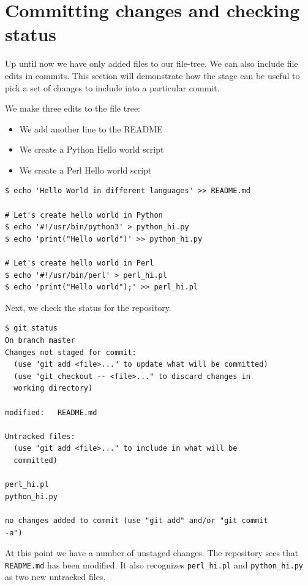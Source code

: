 \documentclass[../main/git_course_main.tex]{subfiles}
\begin{document}
\newpage
\section{Committing changes and checking status}

Up until now we have only added files to our file-tree. We can also include file edits in commits. This section will demonstrate how the stage can be useful to pick a set of changes to include into a particular commit.

We make three edits to the file tree:

\begin{itemize}
	\item We add another line to the README
	\item We create a Python Hello world script
	\item We create a Perl Hello world script
\end{itemize}

\begin{codebox}
\begin{lstlisting}
$ echo 'Hello World in different languages' >> README.md

# Let's create hello world in Python
$ echo '#!/usr/bin/python3' > python_hi.py
$ echo 'print("Hello world")' >> python_hi.py

# Let's create hello world in Perl
$ echo '#!/usr/bin/perl' > perl_hi.pl
$ echo 'print("Hello world");' >> perl_hi.pl
\end{lstlisting}
\end{codebox}

Next, we check the status for the repository.

\begin{codebox}
\begin{lstlisting}
$ git status
On branch master
Changes not staged for commit:
  (use "git add <file>..." to update what will be committed)
  (use "git checkout -- <file>..." to discard changes in 
  working directory)

modified:   README.md

Untracked files:
  (use "git add <file>..." to include in what will be 
  committed)
  
perl_hi.pl
python_hi.py

no changes added to commit (use "git add" and/or "git commit 
-a")
\end{lstlisting}
\end{codebox}

At this point we have a number of unstaged changes. The repository sees that \verb$README.md$
 has been modified. It also recognizes \verb$perl_hi.pl$ and \verb$python_hi.py$ as two new untracked files.
\end{document}
